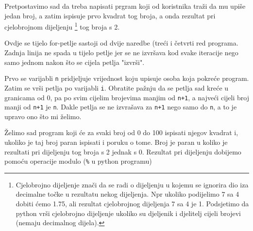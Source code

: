Pretpostavimo sad da treba napisati prgram koji od koristnika tra\v{z}i
da mu upi\v{s}e jedan broj, a zatim ispisuje prvo kvadrat tog broja,
a onda rezultat pri cjelobrojnom dijeljenju 
\footnote{
	Cjelobrojno dijeljenje zna\v{c}i da se radi o dijeljenju u
	kojemu se ignorira dio iza decimalne to\v{c}ke u rezultatu
	nekog dijeljenja. Npr ukoliko podijelimo 7 sa 4 dobiti
	\'{c}emo 1.75, ali rezultat cjelobrojnog dijeljenja 7 sa 4 je
	1. Podsjetimo da python vr\v{s}i cjelobrojno dijeljenje ukoliko
	su djeljenik i djelitelj cijeli brojevi (nemaju decimalnog
	dijela).
}
tog broja s 2.


Ovdje se tijelo for-petlje sastoji od dvije naredbe (tre\'{c}i i
\v{c}etvrti red programa. Zadnja linija ne spada u tijelo petlje jer
se ne izvr\v{s}ava kod svake iteracije nego samo jednom nakon \v{s}to se
cijela petlja "izvr\v{s}i".

Prvo se varijabli \verb"n" pridjeljuje vrijednost koju upisuje
osoba koja pokre\'{c}e program. Zatim se vr\v{s}i petlja po varijabli
\verb"i". Obratite pa\v{z}nju da se petlja sad kre\'{c}e u granicama od
0, pa po svim cijelim brojevima manjim od \verb"n+1", a najve\'{c}i
cijeli broj manji od \verb"n+1" je \verb"n". Dakle petlja se ne
izvra\v{s}ava za \verb"n+1" nego samo do \verb"n", a to je upravo ono
\v{s}to mi \v{z}elimo.

\v{Z}elimo sad program koji \'{c}e za svaki broj od 0 do 100 ispisati
njegov kvadrat i, ukoliko je taj broj paran ispisati i poruku o
tome. Broj je paran u koliko je rezultati pri dijeljenju tog broja
s 2 jednak s 0. Rezultat pri dijeljenju dobijemo pomo\'{c}u operacije
modulo (\verb"%" u python programu)


